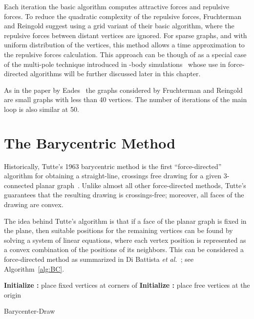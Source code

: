 \documentclass[notitlepage,letter,11pt]{article}
\begin{document}
Each iteration the basic algorithm computes  attractive forces
and  repulsive forces. To reduce the quadratic complexity of
the repulsive forces, Fruchterman and Reingold suggest using a grid
variant of their basic algorithm, where the repulsive forces between
distant vertices are ignored. For sparse graphs, and with uniform
distribution of the vertices, this method allows a  time
approximation to the repulsive forces calculation. This approach can
be though of as a special case of the multi-pole technique introduced
in -body simulations~\cite{ref:Greengard:1988a} whose use in
force-directed algorithms will be further discussed later in this
chapter.

As in the paper by Eades~\cite{Eades+1984a} the graphs considered by
Fruchterman and Reingold are small graphs with less than 40
vertices. The number of iterations of the main loop is also similar at
50.






\section{The Barycentric Method}
\label{fd:sec:bar}

Historically, Tutte's 1963 barycentric method is the
first ``force-directed'' algorithm for obtaining a straight-line,
crossings free drawing for a given 3-connected planar graph~\cite{t-hdg-63}. Unlike
almost all other force-directed methods, Tutte's guarantees that the
resulting drawing is crossings-free; moreover, all faces of the
drawing are convex.

The idea behind Tutte's algorithm is that if a face of the planar
graph is fixed in the plane, then suitable positions for the remaining
vertices can be found by solving a system of linear equations, where
each vertex position is represented as a convex combination of the
positions of its neighbors. This can be considered a force-directed
method as summarized in Di Battista {\em et al.}~\cite{dett-gd}; see Algorithm~\ref{alg:BC}.

\begin{algorithm}
{\bf Initialize :} place fixed vertices  at corners of \;
{\bf Initialize :} place free vertices  at the origin\;
\caption{Barycenter-Draw\label{alg:BC}}
\end{algorithm}
\end{document}
